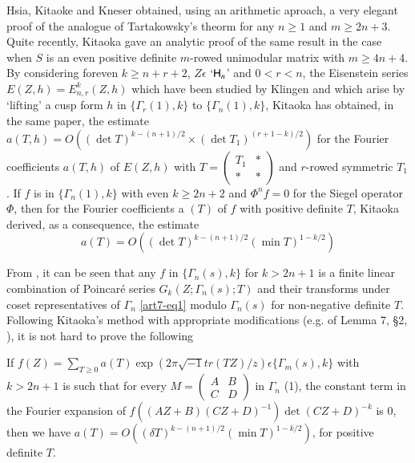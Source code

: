 Hsia, Kitaoke and Kneser \cite{art7-H-K-K} obtained, using an arithmetic aproach, a very elegant proof of the analogue of Tartakowsky's theorm for any $n \geqslant 1$ and $m \geqslant 2 n +3$. Quite recently, Kitaoka \cite{art7-KI} gave an analytic proof of the same result in the case when $S$ is an even positive definite $m$-rowed unimodular matrix with $m \geqslant 4n + 4$. By considering for\pageoriginale even $k \geqslant n + r + 2$, $Z \epsilon$ `$\mathsf{H}_n$' and $0< r < n$, the Eisenstein series $E(Z,h) = E^k_{n,r} (Z,h)$ which have been studied by Klingen \cite{art7-KL} and which arise by `lifting' a cusp form $h$ in $\{\Gamma_r (1), k\}$ to $\{\Gamma_n (1), k\}$, Kitaoka has obtained, in the same paper, the estimate $a(T, h) = O((\det T)^{k-(n+1)/2} \times (\det T_1)^{(r+1-k)/2})$ for the Fourier coefficients $a(T,h)$ of $E(Z,h)$ with $T = \begin{pmatrix} T_1 & \ast\\ \ast & \ast \end{pmatrix}$ and $r$-rowed symmetric $T_1$. If $f$ is in $\{\Gamma_n(1),k\}$ with even $k \geqslant 2n +2$ and $\Phi^n f = 0$ for the Siegel operator $\Phi$, then for the Fourier coefficients a $(T)$ of $f$ with positive definite $T$, Kitaoka derived, as a consequence, the estimate
\begin{equation*}
a(T) = O((\det T)^{k - (n+1)/2} (\min T)^{1-k/2} )\tag{4} \label{art7-eq4}
\end{equation*}

From \cite{art7-C}, it can be seen that any $f$ in $\{\Gamma_n (s), k\}$ for $k > 2 n +1$ is a finite linear combination of Poincar\'e series $G_k (Z; \Gamma_n(s); T)$ and their transforms under coset representatives of $\Gamma_n$ \eqref{art7-eq1}  modulo $\Gamma_n(s)$ for non-negative definite $T$. Following Kitaoka's method with appropriate modifications (e.g. of Lemma 7, \S 2, \cite{art7-KI}), it is not hard to prove the following 

\begin{theorem*}
If $f(Z) = \sum\limits_{T \geqslant 0} a (T) \exp (2 \pi \sqrt{-1} tr (TZ)/ z) \epsilon \{\Gamma_m (s), k\}$ with $k > 2 n +1$ is such that for every $M = \begin{pmatrix}A & B \\ C & D \end{pmatrix}$ in $\Gamma_n$ (1), the constant term in the Fourier expansion of $f((AZ+B)(CZ+D)^{-1}) \det (CZ+ D)^{-k}$ is $0$, then we have $a(T) = O((\delta T)^{k-(n+1)/2} (\min T)^{1-k/2})$, for positive definite $T$.
\end{theorem*}

